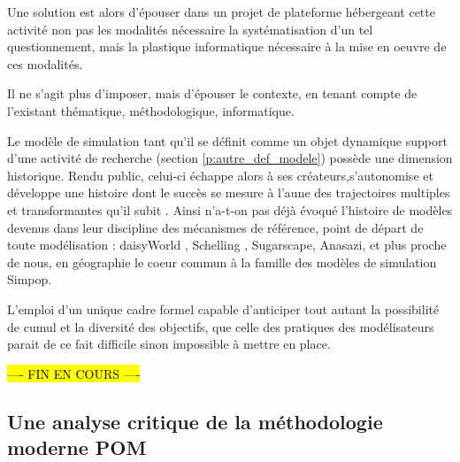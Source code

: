 Une solution est alors d'épouser dans un projet de plateforme hébergeant cette activité non pas les modalités nécessaire la systématisation d'un tel questionnement, mais la plastique informatique nécessaire à la mise en oeuvre de ces modalités. 

Il ne s'agit plus d'imposer, mais d'épouser le contexte, en tenant compte de l'existant thématique, méthodologique, informatique.


Le modèle de simulation tant qu'il se définit comme un objet dynamique support d'une activité de recherche (section \ref{p:autre_def_modele}) possède une dimension historique. Rendu public, celui-ci échappe alors à ses créateurs,s'autonomise et développe une histoire dont le succès se mesure à l'aune des trajectoires multiples et transformantes qu'il subit \autocite{Banos2013a}. Ainsi n'a-t-on pas déjà évoqué l'histoire de modèles devenus dans leur discipline des mécanismes de référence, point de départ de toute modélisation : daisyWorld \autocite{Dutreuil2013}, Schelling \autocite {Bulle2005}, Sugarscape, Anasazi, et plus proche de nous, en géographie le coeur commun à la famille des modèles de simulation Simpop. 

L'emploi d'un unique cadre formel capable d'anticiper tout autant la possibilité de cumul et la diversité des objectifs, que celle des pratiques des modélisateurs parait de ce fait difficile sinon impossible à mettre en place.

\hl{ ---- FIN EN COURS ---- }

\subsection{Une analyse critique de la méthodologie moderne POM}


